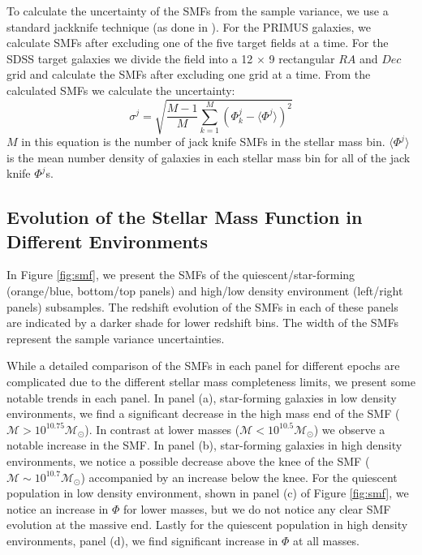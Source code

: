 \documentclass{emulateapj}
\begin{document}
To calculate the uncertainty of the SMFs from the sample variance, we use a standard jackknife technique (as done in \cite{Moustakas:2013aa}). For the PRIMUS galaxies, we calculate SMFs after excluding one of the five target fields at a time. For the SDSS target galaxies we divide the field into a 12 $\times$ 9 rectangular $RA$ and $Dec$ grid and calculate the SMFs after excluding one grid at a time. From the calculated SMFs we calculate the uncertainty: 
\begin{equation}
\sigma^j = \sqrt{\frac{M-1}{M} \sum\limits_{k=1}^{M} (\Phi^j_k - \langle \Phi^j \rangle)^2}
\end{equation} 
$M$ in this equation is the number of jack knife SMFs in the stellar mass bin. $\langle \Phi^j \rangle$ is the mean number density of galaxies in each stellar mass bin for all of the jack knife $\Phi^j$s. 

\subsection{Evolution of the Stellar Mass Function in Different Environments} \label{sec:smfevol}
In Figure \ref{fig:smf}, we present the SMFs of the quiescent/star-forming (orange/blue, bottom/top panels) and high/low density environment (left/right panels) subsamples. The redshift evolution of the SMFs in each of these panels are indicated by a darker shade for lower redshift bins. The width of the SMFs represent the sample variance uncertainties.

While a detailed comparison of the SMFs in each panel for different epochs are complicated due to the different stellar mass completeness limits, we present some notable trends in each panel. In panel (a), star-forming galaxies in low density environments, we find a significant decrease in the high mass end of the SMF ($\mathcal{M} > 10^{10.75} \mathcal{M}_{\odot}$). In contrast at lower masses ($\mathcal{M} < 10^{10.5} \mathcal{M}_{\odot}$) we observe a notable increase in the SMF. In panel (b), star-forming galaxies in high density environments, we notice a possible decrease above the knee of the SMF ($\mathcal{M} \sim 10^{10.7} \mathcal{M}_{\odot}$) accompanied by an increase below the knee. For the quiescent population in low density environment, shown in panel (c) of Figure \ref{fig:smf}, we notice an increase in $\Phi$ for lower masses, but we do not notice any clear SMF evolution at the massive end. Lastly for the quiescent population in high density environments, panel (d), we find significant increase in $\Phi$ at all masses. 
\end{document}
